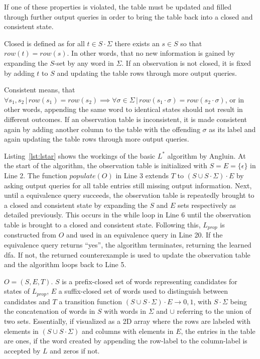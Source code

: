 If one of these properties is violated, the table must be updated and filled through further output queries in order to bring the table back into a closed and consistent state. 

\iffalse
Closed is defined as for all $t \in S \cdot \Sigma$ there exists an $s \in S$ so that $row(t) = row(s)$. In other words, that no new information is gained by expanding the $S$-set by any word in $\Sigma$. If an observation is not closed, it is fixed by adding $t$ to $S$ and updating the table rows through more output queries. 

Consistent means, that $\forall s_1, s_2 \,|\, row(s_1) = row(s_2) \implies \forall \sigma \in \Sigma \,|\, row(s_1 \cdot \sigma) = row(s_2 \cdot \sigma)$, or in other words, appending the same word to identical states should not result in different outcomes. If an observation table is inconsistent, it is made consistent again by adding another column to the table with the offending $\sigma$ as its label and again updating the table rows through more output queries. 


Listing~\ref{lst:lstar} shows the workings of the basic $L^*$ algorithm by Angluin. At the start of the algorithm, the observation table is initialized with $S = E = \{\epsilon\}$ in Line 2. The function $populate(O)$ in Line 3 extends $T$ to $(S \cup S \cdot \Sigma) \cdot E$ by asking output queries for all table entries still missing output information. Next, until a equivalence query succeeds, the observation table is repeatedly brought to a closed and consistent state by expanding the $S$ and $E$ sets respectively as detailed previously. This occurs in the while loop in Line 6 until the observation table is brought to a closed and consistent state. Following this, $L_{prop}$ is constructed from $O$ and used in an equivalence query in Line 20. If the equivalence query returns ``yes'', the algorithm terminates, returning the learned \ac{dfa}. If not, the returned counterexample is used to update the observation table and the algorithm loops back to Line 5. 


$O = (S,E,T)$. $S$ is a prefix-closed set of words representing candidates for states of $L_{prop}$, $E$ a suffix-closed set of words used to distinguish between candidates and $T$ a transition function $(S \cup S \cdot \Sigma) \cdot E \rightarrow {0,1}$, with $S \cdot \Sigma$ being the concatenation of words in $S$ with words in $\Sigma$ and $\cup$ referring to the union of two sets. Essentially, if visualized as a 2D array where the rows are labeled with elements in $(S \cup S \cdot \Sigma)$ and columns with elements in $E$, the entries in the table are ones, if the word created by appending the row-label to the column-label is accepted by $L$ and zeros if not. 

